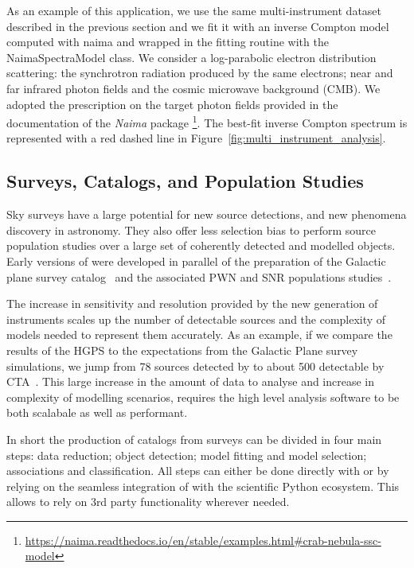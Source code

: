 \documentclass[traditabstract, longauth]{aa}
\begin{document}
As an example of this application, we use the same multi-instrument
dataset described in the previous section and we fit it with an inverse
Compton model computed with naima and wrapped in the \gammapy fitting
 routine with the NaimaSpectraModel class. We consider a log-parabolic
electron distribution scattering: the synchrotron radiation produced by
the same electrons; near and far infrared photon fields and the cosmic
microwave background (CMB). We adopted the prescription on the target
photon fields provided in the
documentation of the \textit{Naima} package \footnote{\url{https://naima.readthedocs.io/en/stable/examples.html\#crab-nebula-ssc-model}}.
The best-fit inverse Compton spectrum is represented with a red dashed line in
Figure~\ref{fig:multi_instrument_analysis}.

\subsection{Surveys, Catalogs, and Population Studies}
\label{ssec:surveys-catalogs-and-population-studies}

Sky surveys have a large potential for new source detections, and new phenomena
discovery in \gammaray astronomy. They also offer less selection bias to perform
source population studies over a large set of coherently detected and modelled objects.
Early versions of \gammapy were developed in parallel of the preparation of
the \hess Galactic plane survey catalog~\citep[HGPS, ][]{2018A&A...612A...1H} and
the associated PWN and SNR populations studies~\citep{2018A&A...612A...2H,
	2018A&A...612A...3H}. 

The increase in sensitivity and resolution provided by the new generation of
instruments scales up the number of detectable sources and the complexity of 
models needed to represent them accurately. As an example, if we compare the
results of the HGPS to the expectations from the \cta Galactic Plane survey
simulations, we jump from 78 sources detected by \hess to about 500 detectable by
CTA~\citep{2021arXiv210903729R}. This large increase in the amount of data to analyse
and increase in complexity of modelling scenarios, requires the high level
analysis software to be both scalabale as well as performant. 

In short the production of catalogs from \gammaray surveys can be divided in
four main steps: data reduction; object detection; model fitting and model
selection; associations and classification. All steps can either be done directly
with \gammapy or by relying on the seamless integration
of \gammapy with the scientific Python ecosystem. This allows to rely
on 3rd party functionality wherever needed.
\end{document}
